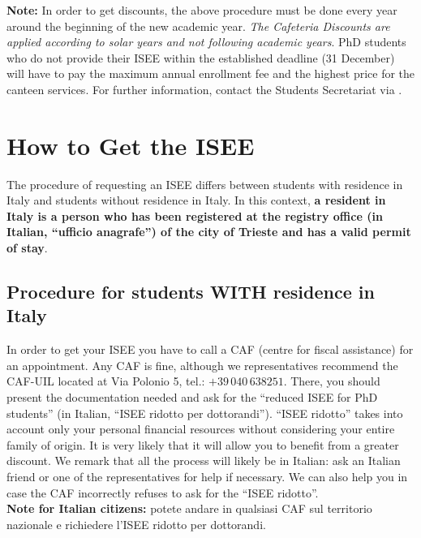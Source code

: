 \documentclass{sissavademecum}
\begin{document}
\textbf{Note:} In order to get discounts, the above procedure must be done every year around the beginning of the new academic year. \emph{The Cafeteria Discounts are applied according to solar years and not following academic years}. PhD students who do not provide their ISEE within the established deadline (31 December) will have to pay the maximum annual enrollment fee and the highest price for the canteen services. For further information, contact the Students Secretariat via .


\section{How to Get the ISEE}

The procedure of requesting an ISEE differs between students with residence in Italy and students without residence in Italy. In this context, \textbf{a resident in Italy is a person who has been registered at the registry office (in Italian, ``ufficio anagrafe'') of the city of Trieste and has a valid permit of stay}.


\subsection{Procedure for students WITH residence in Italy}

In order to get your ISEE you have to call a CAF (centre for fiscal assistance) for an appointment. Any CAF is fine, although we representatives recommend the CAF-UIL located at Via Polonio 5, tel.: $+39 \, 040 \, 638251$. There, you should present the documentation needed and ask for the ``reduced ISEE for PhD students'' (in Italian, ``ISEE ridotto per dottorandi''). ``ISEE ridotto'' takes into account only your personal financial resources without considering your entire family of origin. It is very likely that it will allow you to benefit from a greater discount. We remark that all the process will likely be in Italian: ask an Italian friend or one of the representatives for help if necessary. We can also help you in case the CAF incorrectly refuses to ask for the ``ISEE ridotto''. \\
\textbf{Note for Italian citizens:} potete andare in qualsiasi CAF sul territorio nazionale e richiedere l'ISEE ridotto per dottorandi.
    
\end{document}
